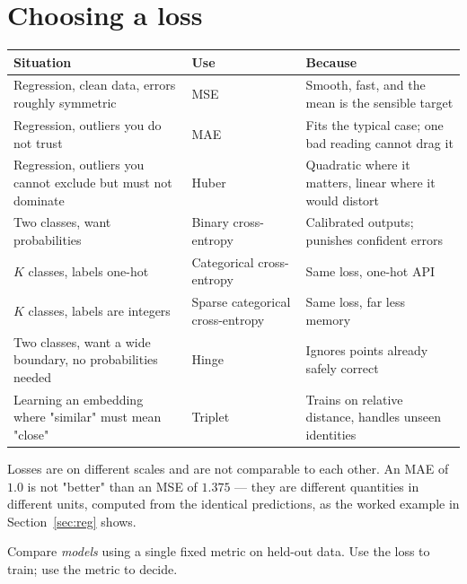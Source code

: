 \documentclass[11pt]{article}
\begin{document}
\newpage
\section{Choosing a loss}
\label{sec:choose}

\begin{center}
\begin{tabular}{@{}p{4.6cm}p{3.1cm}p{6.4cm}@{}}
\toprule
\textbf{Situation} & \textbf{Use} & \textbf{Because}\\
\midrule
Regression, clean data, errors roughly symmetric & MSE & Smooth, fast, and the mean is the sensible target\\[3pt]
Regression, outliers you do not trust & MAE & Fits the typical case; one bad reading cannot drag it\\[3pt]
Regression, outliers you cannot exclude but must not dominate & Huber & Quadratic where it matters, linear where it would distort\\[3pt]
Two classes, want probabilities & Binary cross-entropy & Calibrated outputs; punishes confident errors\\[3pt]
$K$ classes, labels one-hot & Categorical cross-entropy & Same loss, one-hot API\\[3pt]
$K$ classes, labels are integers & Sparse categorical cross-entropy & Same loss, far less memory\\[3pt]
Two classes, want a wide boundary, no probabilities needed & Hinge & Ignores points already safely correct\\[3pt]
Learning an embedding where "similar" must mean "close" & Triplet & Trains on relative distance, handles unseen identities\\
\bottomrule
\end{tabular}
\end{center}

\begin{caution}
Losses are on different scales and are not comparable to each other. An MAE of
$1.0$ is not "better" than an MSE of $1.375$ --- they are different quantities
in different units, computed from the identical predictions, as the worked
example in Section~\ref{sec:reg} shows.

Compare \emph{models} using a single fixed metric on held-out data. Use the
loss to train; use the metric to decide.
\end{caution}
\end{document}
